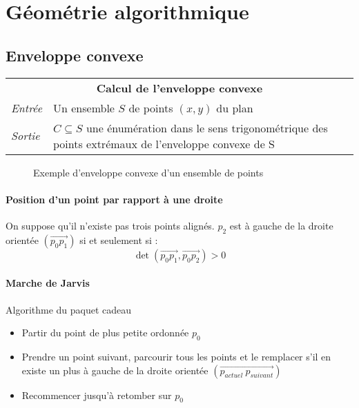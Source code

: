 \documentclass[french]{article}
\begin{document}
\section{Géométrie algorithmique}

\subsection{Enveloppe convexe}

\vspace{0.5cm}
\begin{tabularx}{\textwidth}{p{1cm}X}
\multicolumn{2}{c}{\textbf{Calcul de l'enveloppe convexe}} \\ 
\emph{Entrée} & Un ensemble $S$ de points $(x,y)$ du plan \\ 
\emph{Sortie} & $C \subseteq S$ une énumération dans le sens trigonométrique des points extrémaux de l'enveloppe convexe de S \\
\end{tabularx}

\begin{figure}[H]
\center
{}
\caption{Exemple d'enveloppe convexe d'un ensemble de points}
\end{figure}

\paragraph{Position d'un point par rapport à une droite} On suppose qu'il n'existe pas trois points alignés. $p_2$ est à gauche de la droite orientée $(\vec{p_0p_1})$ si et seulement si :
 \[ \det(\vec{p_0p_1}, \vec{p_0p_2}) > 0 \]
 
\paragraph{Marche de Jarvis} Algorithme du paquet cadeau
\begin{itemize}
	\item Partir du point de plus petite ordonnée $p_0$
	\item Prendre un point suivant, parcourir tous les points et le remplacer s'il en existe un plus à gauche de la droite orientée $(\vec{p_{actuel}~p_{suivant}})$
	\item Recommencer jusqu'à retomber sur $p_0$
\end{itemize}
\end{document}

